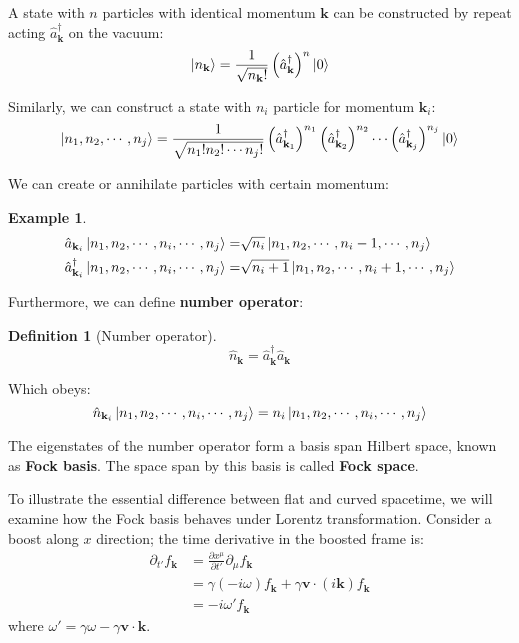 \documentclass[12pt]{article}
\numberwithin{equation}{section}
\theoremstyle{1style}
\newtheorem{definition}[equation]{Definition}
\newtheorem{example}[equation]{Example}
\newcommand{\tbf}[1]{\textbf{#1}}
\newcommand{\p}{\partial}
\begin{document}
A state with \(n\) particles with identical momentum \(\mathbf{k}\) can be constructed by repeat acting \(\hat{a}^{\dagger}_{\mathbf{k}}\)
on the vacuum:
\begin{equation}
  \ket{n_{\mathbf{k}}}=\frac{1}{\sqrt{n_{\mathbf{k}}!}}\left(\hat{a}^{\dagger}_{\mathbf{k}}\right)^{n}\ket{0}
\end{equation}

Similarly, we can construct a state with \(n_{i}\) particle for momentum \(\mathbf{k}_i\):
\begin{equation}
  \ket{n_1,n_2,\cdots,n_j}=\frac{1}{\sqrt{n_1!n_2!\cdots n_j!}}\left(\hat{a}^{\dagger}_{\mathbf{k}_1}\right)^{n_1}
  \left(\hat{a}^{\dagger}_{\mathbf{k}_2}\right)^{n_2}\cdots \left(\hat{a}^{\dagger}_{\mathbf{k}_j}\right)^{n_j}\ket{0}
\end{equation}

We can create or annihilate particles with certain momentum:
\begin{example}
  \begin{align*}
    \hat{a}_{\mathbf{k}_i}\ket{n_1,n_2,\cdots,n_i,\cdots,n_j}=           & \sqrt{n_i}\ket{n_1,n_2,\cdots,n_i-1,\cdots,n_j}   \\
    \hat{a}^{\dagger}_{\mathbf{k}_i}\ket{n_1,n_2,\cdots,n_i,\cdots,n_j}= & \sqrt{n_i+1}\ket{n_1,n_2,\cdots,n_i+1,\cdots,n_j}
  \end{align*}
\end{example}

Furthermore, we can define \tbf{number operator}:
\begin{definition}[Number operator]
  \[\hat{n}_{\mathbf{k}}=\hat{a}^\dagger_{\mathbf{k}}\hat{a}_{\mathbf{k}}\]
\end{definition}

Which obeys:
\begin{equation}
  \hat{n}_{\mathbf{k}_i}\ket{n_1,n_2,\cdots,n_i,\cdots,n_j}=    n_i\ket{n_1,n_2,\cdots,n_i,\cdots,n_j}
\end{equation}

The eigenstates of the number operator form a basis span Hilbert space, known as \tbf{Fock basis}.
The space span by this basis is called \tbf{Fock space}.

To illustrate the essential difference between flat and curved spacetime, we will examine how the Fock basis behaves under Lorentz transformation.
Consider a boost along \(x\) direction; the time derivative in the boosted frame is:
\begin{align}\label{pg}
  \p_{t'}f_{\mathbf{k}} & =\frac{\p x^{\mu}}{\p t'}\p_{\mu}f_{\mathbf{k}}                                   \\
                        & =\gamma(-i\omega)f_{\mathbf{k}}+\gamma\mathbf{v}\cdot (i\mathbf{k})f_{\mathbf{k}} \\
                        & =-i\omega'f_{\mathbf{k}}
\end{align}
where \(\omega'=\gamma\omega-\gamma\mathbf{v}\cdot \mathbf{k}.\)
\end{document}
